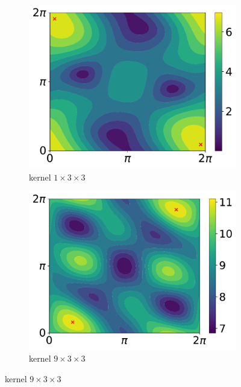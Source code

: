 \begin{figure}[htb]
  \centering
  \begin{subfigure}[b]{.49\textwidth}
    \centering
    \includegraphics[scale=0.35]{figures/main/ch5-lipschitz_regularization/contour_poly_200_1_1_3.pdf}
    \caption{kernel $1\times3\times3$}
  \end{subfigure}
  \hfill
  \begin{subfigure}[b]{.49\textwidth}
    \centering
    \includegraphics[scale=0.35]{figures/main/ch5-lipschitz_regularization/contour_poly_200_1_9_3.pdf}
    \caption{kernel $9\times3\times3$}
  \end{subfigure}
  \par\bigskip

\end{figure}
